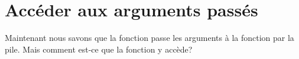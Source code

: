 \section{Accéder aux arguments passés} %
\myindex{\Stack}

Maintenant nous savons que la fonction  passe les arguments
à la fonction  par la pile.
Mais comment est-ce que la fonction  y accède?








